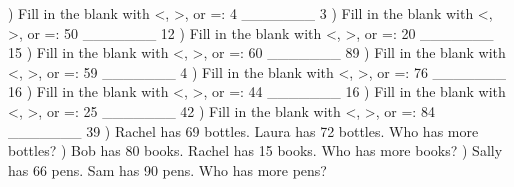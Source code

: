 \documentclass{article}%
\begin{document}
\newline%
) Fill in the blank with <, >, or =: 4 \_\_\_\_\_\_\_ 3%
\newline%
\newline%
) Fill in the blank with <, >, or =: 50 \_\_\_\_\_\_\_ 12%
\newline%
\newline%
) Fill in the blank with <, >, or =: 20 \_\_\_\_\_\_\_ 15%
\newline%
\newline%
) Fill in the blank with <, >, or =: 60 \_\_\_\_\_\_\_ 89%
\newline%
\newline%
) Fill in the blank with <, >, or =: 59 \_\_\_\_\_\_\_ 4%
\newline%
\newline%
) Fill in the blank with <, >, or =: 76 \_\_\_\_\_\_\_ 16%
\newline%
\newline%
) Fill in the blank with <, >, or =: 44 \_\_\_\_\_\_\_ 16%
\newline%
\newline%
) Fill in the blank with <, >, or =: 25 \_\_\_\_\_\_\_ 42%
\newline%
\newline%
) Fill in the blank with <, >, or =: 84 \_\_\_\_\_\_\_ 39%
\newline%
\newline%
) Rachel has 69 bottles. Laura has 72 bottles. Who has more bottles?%
\newline%
\newline%
) Bob has 80 books. Rachel has 15 books. Who has more books?%
\newline%
\newline%
) Sally has 66 pens. Sam has 90 pens. Who has more pens?%
\newline%
\newline%
\newline%
\end{document}
